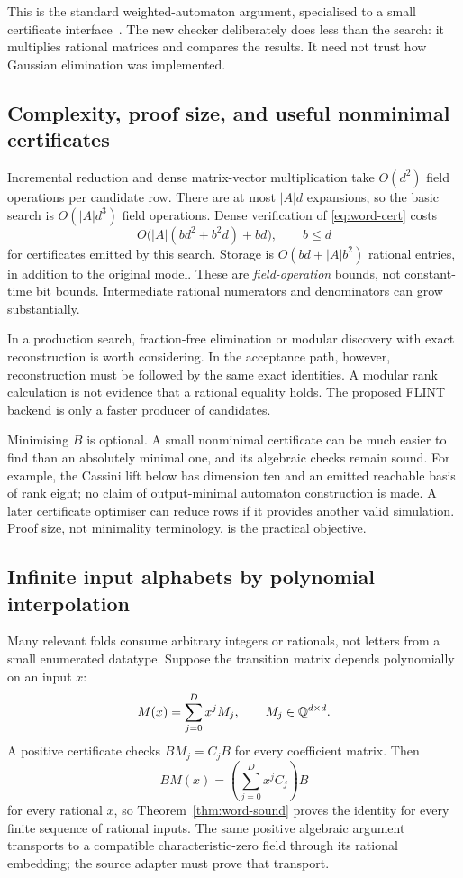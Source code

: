 This is the standard weighted-automaton argument, specialised to a small
certificate interface~\cite{kiefer}. The new checker deliberately does less
than the search: it multiplies rational matrices and compares the results.
It need not trust how Gaussian elimination was implemented.

\subsection{Complexity, proof size, and useful nonminimal certificates}

Incremental reduction and dense matrix-vector multiplication take $O(d^2)$
field operations per candidate row. There are at most $|A|d$ expansions, so the
basic search is $O(|A|d^3)$ field operations. Dense verification of
\eqref{eq:word-cert} costs
\[
O\bigl(|A|(bd^2+b^2d)+bd\bigr),\qquad b\le d
\]
for certificates emitted by this search. Storage is
$O(bd+|A|b^2)$ rational entries, in addition to the original model.
These are \emph{field-operation} bounds, not constant-time bit bounds.
Intermediate rational numerators and denominators can grow substantially.

In a production search, fraction-free elimination or modular discovery with
exact reconstruction is worth considering. In the acceptance path, however,
reconstruction must be followed by the same exact identities. A modular rank
calculation is not evidence that a rational equality holds. The proposed FLINT
backend is only a faster producer of candidates.

Minimising $B$ is optional. A small nonminimal certificate can be much easier to
find than an absolutely minimal one, and its algebraic checks remain sound.
For example, the Cassini lift below has dimension ten and an emitted reachable
basis of rank eight; no claim of output-minimal automaton construction is made.
A later certificate optimiser can reduce rows if it provides another valid
simulation. Proof size, not minimality terminology, is the practical objective.

\subsection{Infinite input alphabets by polynomial interpolation}
\label{sec:alphabet}

Many relevant folds consume arbitrary integers or rationals, not letters from a
small enumerated datatype. Suppose the transition matrix depends polynomially
on an input $x$:
\begin{equation}\label{eq:poly-transition}
M(x)=\sum_{j=0}^{D}x^jM_j,\qquad M_j\in\mathbb Q^{d\times d}.
\end{equation}
A positive certificate checks $BM_j=C_jB$ for every coefficient matrix. Then
\[
BM(x)=\left(\sum_{j=0}^{D}x^jC_j\right)B
\]
for every rational $x$, so Theorem~\ref{thm:word-sound} proves the identity for
every finite sequence of rational inputs. The same positive algebraic argument
transports to a compatible characteristic-zero field through its rational
embedding; the source adapter must prove that transport.

